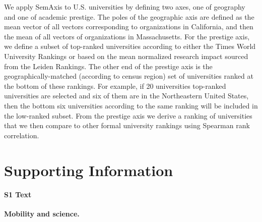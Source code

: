 \documentclass[12pt]{article} %
\newcommand{\beginsupplement}{%
        \setcounter{table}{0}
        \renewcommand{\thetable}{S\arabic{table}}%
        \setcounter{figure}{0}
        \renewcommand{\thefigure}{S\arabic{figure}}%
     }
\begin{document}
We apply SemAxis to U.S. universities by defining two axes, one of geography and one of academic prestige.
The poles of the geographic axis are defined as the mean vector of all vectors corresponding to organizations in California, and then the mean of all vectors of organizations in Massachusetts.
For the prestige axis, we define a subset of top-ranked universities according to either the Times World University Rankings or based on the mean normalized research impact sourced from the Leiden Rankings.
The other end of the prestige axis is the geographically-matched (according to census region) set of universities ranked at the bottom of these rankings.
For example, if 20 universities top-ranked universities are selected and six of them are in the Northeastern United States, then the bottom six universities according to the same ranking will be included in the low-ranked subset.
From the prestige axis we derive a ranking of universities that we then compare to other formal university rankings using Spearman rank correlation. 


\clearpage
\beginsupplement
\section{Supporting Information}



%
%
\paragraph*{S1 Text}
\label{si:text:mobility_science}
{\bf Mobility and science.}
\end{document}
